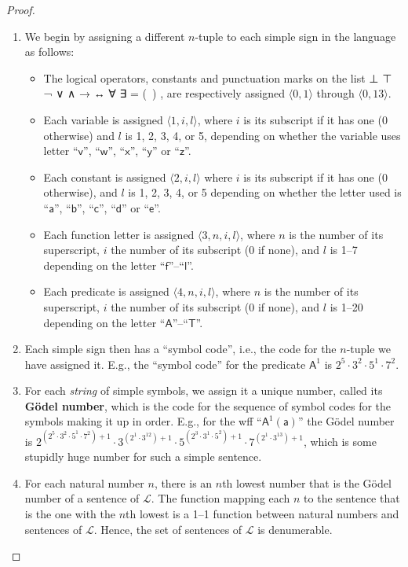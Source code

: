 \documentclass[12pt]{report}
\theoremstyle{nonumberplain}
\newtheorem{proof}{Proof}
\newcommand{\defm}[1]{\textbf{#1}\index{#1}}
\renewcommand{\o}[1]{\mathsf{#1}}
\begin{document}
\begin{proof}
\begin{enumerate}
\item We begin by assigning a different $n$-tuple to each simple sign in the language as follows:
\begin{itemize}[nolistsep,leftmargin=*]
\item \label{simpcodes}The logical operators, constants and punctuation marks on the list ⊥ ⊤ ¬ ∨ ∧ → ↔ ∀ ∃ = (~) , are respectively assigned $⟨0,1⟩$ through $⟨0,13⟩$.
\item Each variable is assigned $⟨1,i,l⟩$, where  $i$ is its subscript if it has one (0 otherwise) and $l$ is 1, 2, 3, 4, or 5, depending on whether the variable uses letter ``$\o{v}$'', ``$\o{w}$'', ``$\o{x}$'', ``$\o{y}$'' or ``$\o{z}$''.
\item Each constant is assigned $⟨2,i,l⟩$ where $i$ is its subscript if it has one (0 otherwise), and $l$ is 1, 2, 3, 4, or 5 depending on whether the letter used is ``$\o{a}$'', ``$\o{b}$'', ``$\o{c}$'', ``$\o{d}$'' or ``$\o{e}$''.

\item Each function letter is assigned $⟨3,n,i,l⟩$, where $n$ is the number of its superscript, $i$ the number of its subscript (0 if none), and $l$ is 1--7 depending on the letter ``$\o{f}$''--``$\o{l}$''.

\item Each predicate is assigned $⟨4,n,i,l⟩$, where $n$ is the number of its superscript, $i$ the number of its subscript (0 if none), and $l$ is 1--20 depending on the letter ``$\o{A}$''--``$\o{T}$''.

\end{itemize}
\item Each simple sign then has a ``symbol code'', i.e., the code for the $n$-tuple we have assigned it. E.g., the ``symbol code'' for the predicate $\o{A}^1$ is $2^5 \cdot 3^2 \cdot 5^1 \cdot 7^2$.
\item For each \emph{string} of simple symbols, we assign it a unique number, called its \defm{Gödel number}, which is the code for the sequence of symbol codes for the symbols making it up in order. E.g., for the wff ``$\o{A}^1(\o{a})$'' the Gödel number is $2^{(2^5 \cdot 3^2 \cdot 5^1 \cdot 7^2)+1} \cdot 3^{(2^1 \cdot 3^{12})+1} \cdot 5^{(2^3 \cdot 3^1 \cdot 5^2)+1} \cdot 7^{(2^1 \cdot 3^{13})+1}$, which is some stupidly huge number for such a simple sentence.
\item For each natural number $n$, there is an $n$th lowest number that is the Gödel number of a sentence of $\mathcal{L}$. The function mapping each $n$ to the sentence that is the one with the $n$th lowest is a 1--1 function between natural numbers and sentences of $\mathcal{L}$. Hence, the set of sentences of $\mathcal{L}$ is denumerable.
\end{enumerate}
\end{proof}
\end{document}
